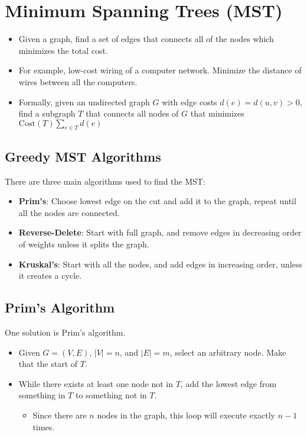 \documentclass[10pt]{article}
\begin{document}
\section*{Minimum Spanning Trees (MST)}
\begin{itemize}
	\item Given a graph, find a set of edges that connects all of the nodes which minimizes the total cost.
	\item For example, low-cost wiring of a computer network.  Minimize the distance of wires between all the computers.
	\item Formally, given an undirected graph $G$ with edge costs $d(e) = d(u, v) > 0$, find a subgraph $T$ that connects all nodes of $G$ that minimizes $\text{Cost}(T) \sum_{e \in T} d(e)$
\end{itemize}
\subsection*{Greedy MST Algorithms}
There are three main algorithms used to find the MST:
\begin{itemize}
	\item \textbf{Prim's}: Choose lowest edge on the cut and add it to the graph, repeat until all the nodes are connected.
	\item \textbf{Reverse-Delete}: Start with full graph, and remove edges in decreasing order of weights unless it splits the graph.
	\item \textbf{Kruskal's}: Start with all the nodes, and add edges in increasing order, unless it creates a cycle.
\end{itemize}

\subsection*{Prim's Algorithm}
One solution is Prim's algorithm.
\begin{itemize}
	\item Given $G = (V, E)$, $|V| = n$, and $|E| = m$, select an arbitrary node.  Make that the start of $T$.
	\item While there exists at least one node not in $T$, add the lowest edge from something in $T$ to something not in $T$.
	\begin{itemize}
	    \item Since there are $n$ nodes in the graph, this loop will execute exactly $n - 1$ times.
    \end{itemize}
\end{itemize}
\end{document}
